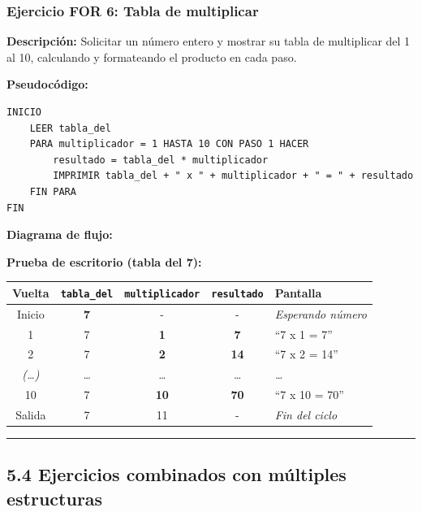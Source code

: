 \subsubsection{Ejercicio FOR 6: Tabla de
multiplicar}\label{ejercicio-for-6-tabla-de-multiplicar}

\textbf{Descripción:} Solicitar un número entero y mostrar su tabla de
multiplicar del 1 al 10, calculando y formateando el producto en cada
paso.

\textbf{Pseudocódigo:}

\begin{verbatim}
INICIO
    LEER tabla_del
    PARA multiplicador = 1 HASTA 10 CON PASO 1 HACER
        resultado = tabla_del * multiplicador
        IMPRIMIR tabla_del + " x " + multiplicador + " = " + resultado
    FIN PARA
FIN
\end{verbatim}

\textbf{Diagrama de flujo:}



\textbf{Prueba de escritorio (tabla del 7):}

{\def\LTcaptype{none} %
\begin{longtable}[]{@{}ccccl@{}}
\toprule\noalign{}
Vuelta & \texttt{tabla\_del} & \texttt{multiplicador} &
\texttt{resultado} & Pantalla \\
\midrule\noalign{}
\endhead
\bottomrule\noalign{}
\endlastfoot
Inicio & \textbf{7} & - & - & \emph{Esperando número} \\
1 & 7 & \textbf{1} & \textbf{7} & ``7 x 1 = 7'' \\
2 & 7 & \textbf{2} & \textbf{14} & ``7 x 2 = 14'' \\
\emph{(\ldots)} & \emph{\ldots{}} & \emph{\ldots{}} & \emph{\ldots{}} &
\emph{\ldots{}} \\
10 & 7 & \textbf{10} & \textbf{70} & ``7 x 10 = 70'' \\
Salida & 7 & 11 & - & \emph{Fin del ciclo} \\
\end{longtable}
}

\begin{center}\rule{0.5\linewidth}{0.5pt}\end{center}

\subsection{5.4 Ejercicios combinados con múltiples
estructuras}\label{ejercicios-combinados-con-muxfaltiples-estructuras}

